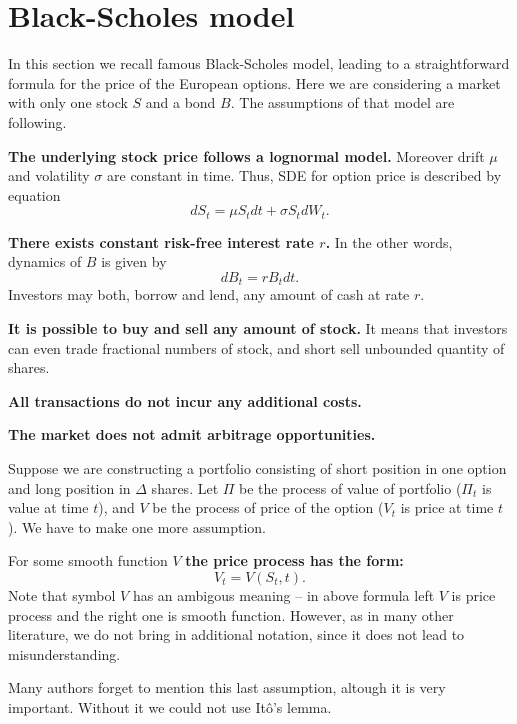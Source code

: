 \documentclass[a4paper,12pt, oneside]{book}
\theoremstyle{definition}
\theoremstyle{remark}
\begin{document}
\section{Black-Scholes model}
In this section we recall famous Black-Scholes model, leading to a straightforward formula for the price of the European options. Here we are considering a market with only one stock $S$ and a bond $B$. The assumptions of that model are following.

\noindent \textbf{The underlying stock price follows a lognormal model.} Moreover drift $\mu$ and volatility $\sigma$ are constant in time. Thus, SDE for option price is described by equation
\begin{equation}
 \label{eq:stockDynamics}
 dS_t = \mu S_t dt + \sigma S_t dW_t. 
\end{equation}

\noindent \textbf{There exists constant risk-free interest rate $r$.} In the other words, dynamics of $B$ is given by 
\[ dB_t = rB_t dt. \]
Investors may both, borrow and lend, any amount of cash at rate $r$.

\noindent \textbf{It is possible to buy and sell any amount of stock.} It means that investors can even trade fractional numbers of stock, and short sell unbounded quantity of shares.

\noindent \textbf{All transactions do not incur any additional costs.}

\noindent \textbf{The market does not admit arbitrage opportunities.}

Suppose we are constructing a portfolio consisting of short position in one option and long position in $\Delta$ shares. 
Let $\Pi$ be the process of value of portfolio ($\Pi_t$ is value at time $t$), and $V$ be the process of price of the option ($V_t$ is price at time $t$). We have to make one more assumption. 

For some smooth function $V$ \textbf{the price process has the form:}
\[ V_t = V(S_t, t). \]
Note that symbol $V$ has an ambigous meaning -- in above formula left $V$ is price process and the right one is smooth function. However, as in many other literature, we do not bring in additional notation, since it does not lead to misunderstanding.

Many authors forget to mention this last assumption, altough it is very important. Without it we could not use It\^{o}'s lemma.
\end{document}
